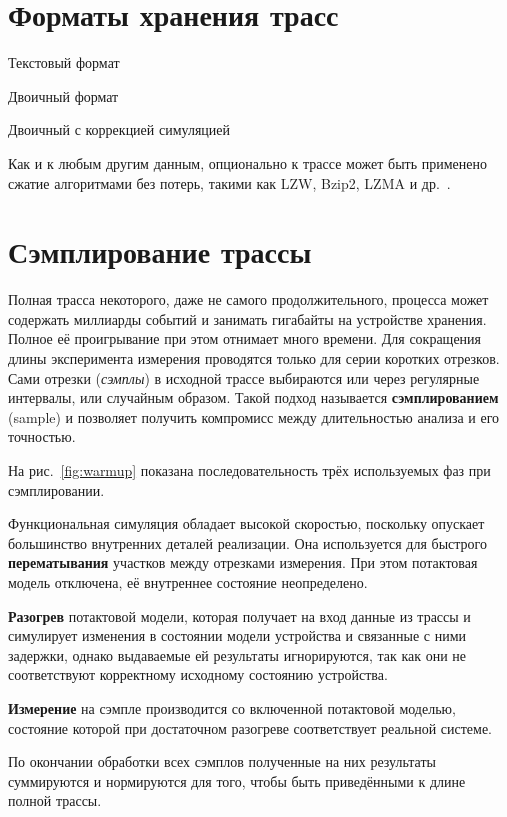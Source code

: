 \section{Форматы хранения трасс}

\begin{description*}
    \item[Текстовый формат] \todo
    \item[Двоичный формат] \todo
    \item[Двоичный с коррекцией симуляцией] \todo
\end{description*}

Как и к любым другим данным, опционально к трассе может быть применено сжатие алгоритмами без потерь, такими как LZW, Bzip2, LZMA и др.~\cite{sayood2002lossless}.

\section{Сэмплирование трассы}

Полная трасса некоторого, даже не самого продолжительного, процесса может содержать миллиарды событий и занимать гигабайты на устройстве хранения. Полное её проигрывание при этом отнимает много времени. Для сокращения длины эксперимента измерения проводятся только для серии коротких отрезков. Сами отрезки (\textit{сэмплы}) в исходной трассе выбираются или через регулярные интервалы, или случайным образом. Такой подход называется \textbf{сэмплированием} (\abbr sample) и позволяет получить компромисс между длительностью анализа и его точностью.

На рис.~\ref{fig:warmup} показана последовательность трёх используемых фаз при сэмплировании.
\begin{itemize*}
    \item Функциональная симуляция обладает высокой скоростью, поскольку опускает большинство внутренних деталей реализации. Она используется для быстрого \textbf{перематывания} участков между отрезками измерения. При этом потактовая модель отключена, её внутреннее состояние неопределено.
    \item \textbf{Разогрев} потактовой модели, которая получает на вход данные из трассы и симулирует изменения в состоянии модели устройства и связанные с ними задержки,  однако выдаваемые ей результаты игнорируются, так как они не соответствуют корректному исходному состоянию устройства. 
    \item \textbf{Измерение} на сэмпле производится со включенной потактовой моделью, состояние которой при достаточном разогреве соответствует реальной системе.
    \item По окончании обработки всех сэмплов полученные на них результаты суммируются и нормируются для  того, чтобы быть приведёнными к длине полной трассы.
\end{itemize*}

